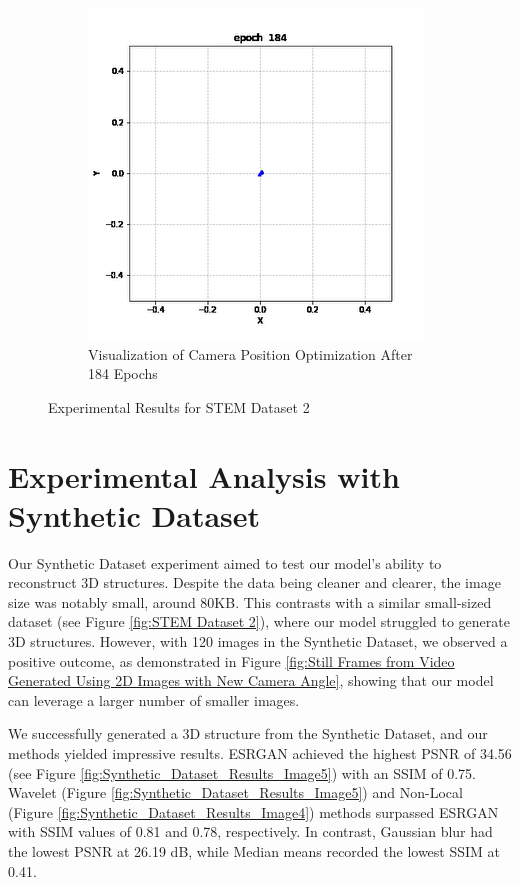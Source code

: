 \begin{figure}[H]
\begin{subfigure}{.47\textwidth}
        \includegraphics[width=\textwidth]{img/Results/STEM dataset 2/Screenshot 2023-12-23 164924.png}
        \caption{Visualization of Camera Position Optimization After 184 Epochs}
        \label{fig:STEM2Image2}
    \end{subfigure}
    \caption{Experimental Results for STEM Dataset 2}
    \label{fig:STEM_Dataset_1_Results}
\end{figure}


\clearpage
\section{Experimental Analysis with Synthetic Dataset}
Our Synthetic Dataset experiment aimed to test our model's ability to reconstruct 3D structures. Despite the data being cleaner and clearer, the image size was notably small, around 80KB. This contrasts with a similar small-sized dataset (see Figure \ref{fig:STEM Dataset 2}), where our model struggled to generate 3D structures. However, with 120 images in the Synthetic Dataset, we observed a positive outcome, as demonstrated in Figure \ref{fig:Still Frames from Video Generated Using 2D Images with New Camera Angle}, showing that our model can leverage a larger number of smaller images.

\vspace{10pt}
We successfully generated a 3D structure from the Synthetic Dataset, and our methods yielded impressive results. ESRGAN achieved the highest PSNR of 34.56 (see Figure \ref{fig:Synthetic_Dataset_Results_Image5}) with an SSIM of 0.75. Wavelet (Figure \ref{fig:Synthetic_Dataset_Results_Image5}) and Non-Local (Figure \ref{fig:Synthetic_Dataset_Results_Image4}) methods surpassed ESRGAN with SSIM values of 0.81 and 0.78, respectively. In contrast, Gaussian blur had the lowest PSNR at 26.19 dB, while Median means recorded the lowest SSIM at 0.41. 

